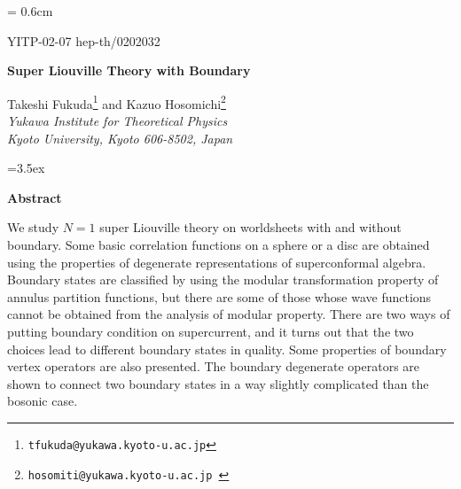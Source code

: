 \documentclass[a4paper,12pt]{article}
\begin{document}
\renewcommand{\thefootnote}{\fnsymbol{footnote}}
\setcounter{footnote}{0}
\setcounter{section}{0}
\baselineskip = 0.6cm
\pagestyle{empty}


\baselineskip 5mm
\hfill\vbox{\hbox{YITP-02-07}
            \hbox{hep-th/0202032} }

\baselineskip0.8cm\vskip2cm

\begin{center}
 {\large\bf Super Liouville Theory with Boundary}
\end{center}

\vskip10mm

\baselineskip0.6cm
\begin{center}
       Takeshi Fukuda\footnote{ \tt tfukuda@yukawa.kyoto-u.ac.jp}
   and Kazuo Hosomichi\footnote{\tt hosomiti@yukawa.kyoto-u.ac.jp }
 \\ \vskip2mm
{\it Yukawa Institute for Theoretical Physics \\
     Kyoto University, Kyoto 606-8502, Japan} \vskip3mm
\end{center}

\vskip8mm\baselineskip=3.5ex
\begin{center}{\bf Abstract}\end{center}\par\smallskip

   We study $N=1$ super Liouville theory on worldsheets
 with and without boundary.
 Some basic correlation functions on a sphere or a disc
 are obtained using the properties of degenerate representations
 of superconformal algebra.
 Boundary states are classified by using the modular
 transformation property of annulus partition functions,
 but there are some of those whose wave functions
 cannot be obtained from the analysis of modular property.
 There are two ways of putting boundary condition on supercurrent,
 and it turns out that the two choices lead to different
 boundary states in quality.
 Some properties of boundary vertex operators are also presented.
 The boundary degenerate operators are shown to connect two
 boundary states in a way slightly complicated than the bosonic
 case.
\end{document}
